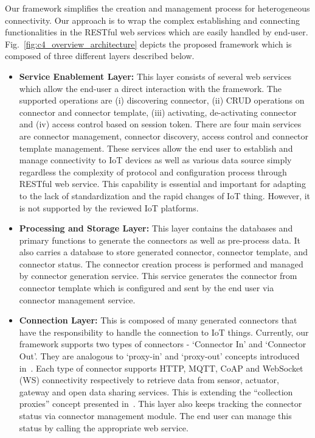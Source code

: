 Our framework simplifies the creation and management process for heterogeneous connectivity. Our approach is to wrap the complex establishing and connecting functionalities in the RESTful web services which are easily handled by end-user. Fig.~\ref{fig:c4_overview_architecture} depicts the proposed framework which is composed of three different layers described below.
\begin{itemize}
    \item \textbf{Service Enablement Layer:} This layer consists of several web services which allow the end-user a direct interaction with the framework. The supported operations are (i) discovering connector, (ii) CRUD operations on connector and connector template, (iii) activating, de-activating connector and (iv) access control based on session token. There are four main services are connector management, connector discovery, access control and connector template management. These services allow the end user to establish and manage connectivity to IoT devices as well as various data source simply regardless the complexity of protocol and configuration process through RESTful web service. This capability is essential and important for adapting to the lack of standardization and the rapid changes of IoT thing. However, it is not supported by the reviewed IoT platforms.
    \item \textbf{Processing and Storage Layer:} This layer contains the databases and primary functions to generate the connectors as well as pre-process data. It also carries a database to store generated connector, connector template, and connector status. The connector creation process is performed and managed by connector generation service. This service generates the connector from connector template which is configured and sent by the end user via connector management service.
    \item \textbf{Connection Layer: } This is composed of many generated connectors that have the responsibility to handle the connection to IoT things. Currently, our framework supports two types of connectors - ‘Connector In’ and ‘Connector Out’. They are analogous to ‘proxy-in’ and ‘proxy-out’ concepts introduced in~\cite{datta2014iot}. Each type of connector supports HTTP, MQTT, CoAP and WebSocket (WS) connectivity respectively to retrieve data from sensor, actuator, gateway and open data sharing services. This is extending the “collection proxies” concept presented in~\cite{datta2016easing}. This layer also keeps tracking the connector status via connector management module. The end user can manage this status by calling the appropriate web service. 
\end{itemize}
